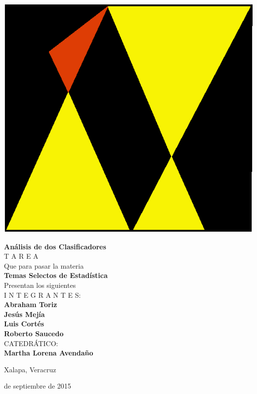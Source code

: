 \documentclass[11pt,letterpaper,reqno]{article}
\begin{document}
\begin{minipage}{.15\textwidth}
	\begin{flushright}
		\includegraphics[scale=.22]{matematicas.eps}
	\end{flushright}
\end{minipage}

\vspace{.7cm}
\begin{center}
{\huge \bf
	Análisis de dos Clasificadores
}
\\[1.5cm]
{ \Huge
	T A R E A
}
\\[1.5cm]

{ \large
	Que para pasar la materia
}
\\[.5cm]
{ \LARGE \bf
	Temas Selectos de Estadística
}
\\[1cm]
Presentan los siguientes\\[1cm]
{ \Large
I N T E G R A N T E S:
}\\
{ \LARGE \bf
	Abraham Toriz\\
	Jesús Mejía\\
	Luis Cortés\\
	Roberto Saucedo
}\\[1cm]
{ \Large
CATEDRÁTICO:
}\\
{ \LARGE \bf
	Martha Lorena Avendaño
}
\end{center}
\vspace{1.5cm}
\begin{minipage}{.5\textwidth}
\centering
Xalapa, Veracruz
\end{minipage}
\begin{minipage}{.5\textwidth}
 de septiembre de 2015
\end{minipage}
\end{document}
